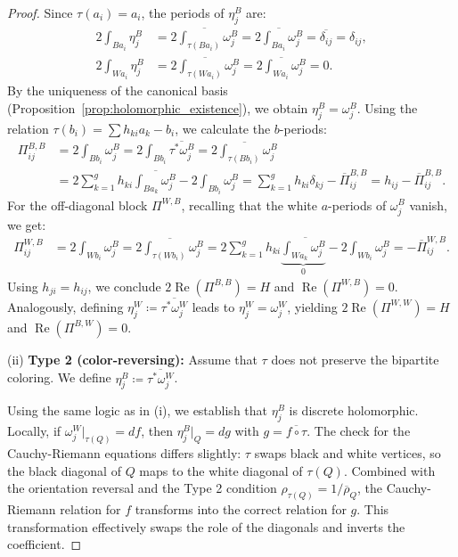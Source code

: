 \documentclass[11pt,a4paper]{article}
\theoremstyle{definition}
\renewcommand{\Re}{\operatorname{Re}}
\begin{document}
\begin{proof}
	Since $\tau(a_i)=a_i$, the periods of $\eta_j^B$ are:
	\begin{align*}
		2\int_{Ba_i} \eta_j^B &= \overline{2\int_{\tau(Ba_i)} \omega_j^B} = \overline{2\int_{Ba_i} \omega_j^B} = \overline{\delta_{ij}} = \delta_{ij}, \\
		2\int_{Wa_i} \eta_j^B &= \overline{2\int_{\tau(Wa_i)} \omega_j^B} = \overline{2\int_{Wa_i} \omega_j^B} = 0.
	\end{align*}
	By the uniqueness of the canonical basis (Proposition~\ref{prop:holomorphic_existence}), we obtain $\eta_j^B = \omega_j^B$.
	Using the relation $\tau(b_i) = \sum h_{ki} a_k - b_i$, we calculate the $b$-periods:
	\begin{align*}
		\Pi_{ij}^{B,B} &= 2 \int_{Bb_i} \omega_j^B = 2 \int_{Bb_i} \overline{\tau^*\omega_j^B} = \overline{2 \int_{\tau(Bb_i)} \omega_j^B} \\
		&= \overline{2 \sum_{k=1}^{g} h_{ki} \int_{Ba_k} \omega_j^B - 2 \int_{Bb_i} \omega_j^B}
		= \sum_{k=1}^g h_{ki} \delta_{kj} - \overline{\Pi}_{ij}^{B,B} = h_{ij} - \overline{\Pi}_{ij}^{B,B}.
	\end{align*}
	For the off-diagonal block $\Pi^{W,B}$, recalling that the white $a$-periods of $\omega_j^B$ vanish, we get:
	\begin{align*}
		\Pi_{ij}^{W,B} &= 2 \int_{Wb_i} \omega_j^B = \overline{2 \int_{\tau(Wb_i)} \omega_j^B}
		= \overline{2 \sum_{k=1}^{g} h_{ki} \underbrace{\int_{Wa_k} \omega_j^B}_{0} - 2 \int_{Wb_i} \omega_j^B}
		= - \overline{\Pi}_{ij}^{W,B}.
	\end{align*}
	Using $h_{ji}=h_{ij}$, we conclude $2 \Re(\Pi^{B,B}) = H$ and $\Re(\Pi^{W,B}) = 0$.
	Analogously, defining $\eta_j^W \coloneqq \overline{\tau^*\omega_j^W}$ leads to $\eta_j^W = \omega_j^W$, yielding $2 \Re(\Pi^{W,W}) = H$ and $\Re(\Pi^{B,W}) = 0$.
	
	(ii) \textbf{Type 2 (color-reversing):} Assume that $\tau$ does not preserve the bipartite coloring. We define $\eta_j^B \coloneqq \overline{\tau^*\omega_j^W}$.
	
	Using the same logic as in (i), we establish that $\eta_j^B$ is discrete holomorphic. Locally, if $\omega_j^W|_{\tau(Q)} = df$, then $\eta_j^B|_Q = dg$ with $g = \overline{f \circ \tau}$. The check for the Cauchy-Riemann equations differs slightly: $\tau$ swaps black and white vertices, so the black diagonal of $Q$ maps to the white diagonal of $\tau(Q)$. Combined with the orientation reversal and the Type 2 condition $\rho_{\tau(Q)} = 1/\overline{\rho}_Q$, the Cauchy-Riemann relation for $f$ transforms into the correct relation for $g$. This transformation effectively swaps the role of the diagonals and inverts the coefficient.
	

\end{proof}
\end{document}
